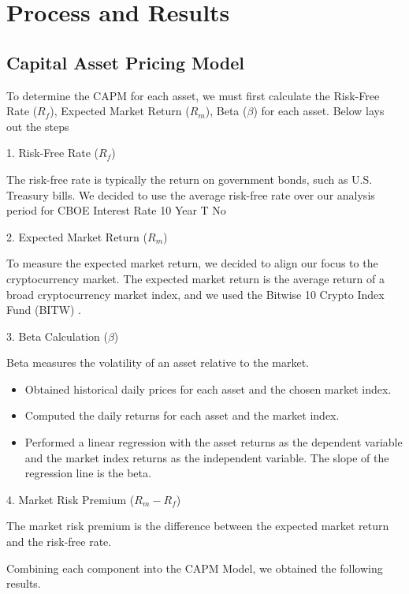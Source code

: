 \section{Process and Results}

\subsection{Capital Asset Pricing Model}
To determine the CAPM for each asset, we must first calculate the Risk-Free Rate (\(R_f\)), Expected Market Return (\(R_m\)), Beta (\(\beta\)) for each asset. Below lays out the steps

1. Risk-Free Rate (\(R_f\))

The risk-free rate is typically the return on government bonds, such as U.S. Treasury bills. We decided to use the average risk-free rate over our analysis period for CBOE Interest Rate 10 Year T No \cite{YahooFinanceTNX}

2. Expected Market Return (\(R_m\))

To measure the expected market return, we decided to align our focus to the cryptocurrency market. The expected market return is the average return of a broad cryptocurrency market index, and we used the Bitwise 10 Crypto Index Fund (BITW) \cite{bitw}.

3. Beta Calculation (\(\beta\))

Beta measures the volatility of an asset relative to the market. 

\begin{itemize}
    \item Obtained historical daily prices for each asset and the chosen market index.
    \item Computed the daily returns for each asset and the market index.
    \item Performed a linear regression with the asset returns as the dependent variable and the market index returns as the independent variable. The slope of the regression line is the beta.
\end{itemize}

4. Market Risk Premium (\(R_m - R_f\))

The market risk premium is the difference between the expected market return and the risk-free rate.

Combining each component into the CAPM Model, we obtained the following results.

